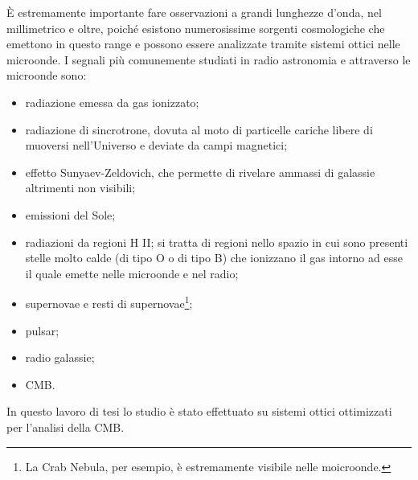 \documentclass[12pt,a4paper,final]{book}
\begin{document}
\`E estremamente importante fare osservazioni a grandi lunghezze d'onda, nel millimetrico e oltre, poiché esistono numerosissime sorgenti cosmologiche che emettono in questo range e possono essere analizzate tramite sistemi ottici nelle microonde.
I segnali più comunemente studiati in radio astronomia e attraverso le microonde sono:
\begin{itemize}
	\item radiazione emessa da gas ionizzato;
	\item radiazione di sincrotrone, dovuta al moto di particelle cariche libere di muoversi nell'Universo e deviate da campi magnetici;
	\item effetto Sunyaev-Zeldovich, che permette di rivelare ammassi di galassie altrimenti non visibili;
	\item emissioni del Sole;
	\item radiazioni da regioni H II; si tratta di regioni nello spazio in cui sono presenti stelle molto calde (di tipo O o di tipo B) che ionizzano il gas intorno ad esse il quale emette nelle microonde e nel radio;
	\item supernovae e resti di supernovae\footnote{La Crab Nebula, per esempio, è estremamente visibile nelle moicroonde.};
	\item pulsar;
	\item radio galassie;
	\item CMB.
\end{itemize}
In questo lavoro di tesi lo studio è stato effettuato su sistemi ottici ottimizzati per l'analisi della CMB.
\end{document}
